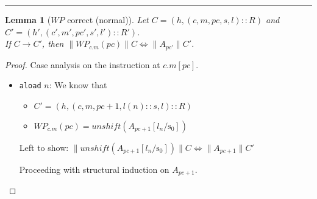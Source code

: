 \documentclass[a4paper,11pt]{article}
\newtheorem{lemma}{Lemma}
\newcommand{\pc}{\mathit{pc}}
\newcommand{\WP}{\mathit{WP}}
\newcommand{\sep}{\hspace{-1.5707965cm}\rule{\paperwidth}{1pt}}
\newcommand{\UNSHIFT}{\mathit{unshift}}
\newcommand{\Stack}{\mathrm{s}}
\begin{document}
\sep

\newpage

\begin{lemma}[$\WP$ correct (normal)]\label{lem:wp_correct_normal}
Let $C = (h, (c, m, \pc, s, l)::R)$ and $C' = (h', (c', m', \pc', s', l')::R')$.\\
If $C \rightarrow C'$, then $\| \WP_{c.m}(\pc) \| C \Leftrightarrow \| A_{\pc'} \| C'$.
\end{lemma}

\begin{proof}
Case analysis on the instruction at $c.m[pc]$.

\begin{itemize}
\item {\tt aload} $n$:
  We know that
  \begin{itemize}
  \item $C' = (h, (c, m, \pc+1, l(n) :: s, l)::R)$
  \item $\WP_{c.m}(\pc) = \UNSHIFT(A_{\pc+1}[l_n/\Stack_0])$
  \end{itemize}
  
  Left to show: $ \| \UNSHIFT(A_{\pc+1}[l_n/\Stack_0]) \| C \Leftrightarrow \| A_{\pc+1} \| C' $
  
  Proceeding with structural induction on $A_{\pc+1}$.
  

\end{itemize}
\end{proof}
\end{document}
